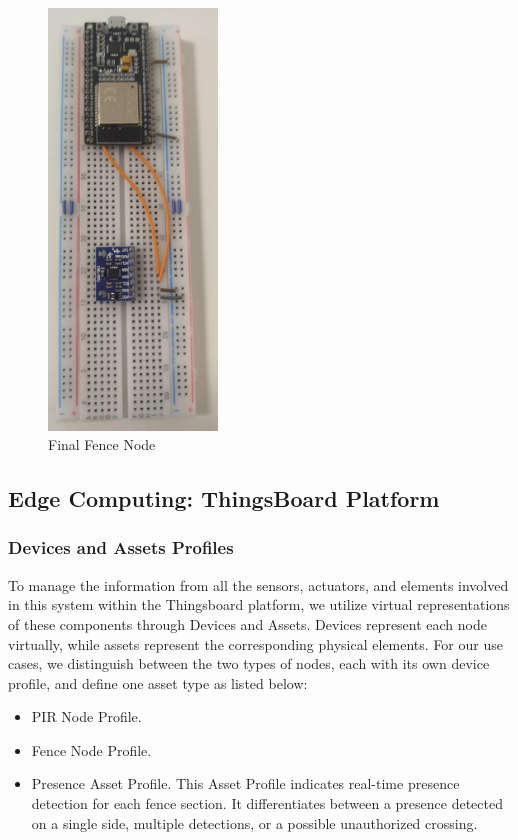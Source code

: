 \begin{figure}[H]
    \centering
    \includegraphics[width=0.4\textwidth,angle=-90]{./images/8/FENCENode.jpg}
    \caption{Final Fence Node}
    \label{fig:FENCEFisico}
\end{figure}

\subsection{Edge Computing: ThingsBoard Platform}

\subsubsection*{Devices and Assets Profiles}

To manage the information from all the sensors, actuators, and elements involved in this system within the Thingsboard platform, we utilize virtual representations of 
these components through Devices and Assets. Devices represent each node virtually, while assets represent the corresponding physical elements. For our use cases, we 
distinguish between the two types of nodes, each with its own device profile, and define one asset type as listed below:
\begin{itemize}
    \item PIR Node Profile.
    \item Fence Node Profile.
    \item Presence Asset Profile. This Asset Profile indicates real-time presence detection for each fence section. It differentiates between a presence detected on 
    a single side, multiple detections, or a possible unauthorized crossing.
\end{itemize}


